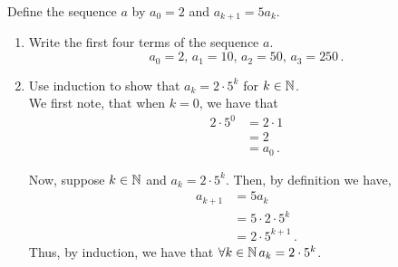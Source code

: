 \guard



\begin{exmp}
\label{exmp:showClosedFormFormulaWorks}
  Define the sequence $a$ by $a_0=2$ and $a_{k+1} = 5a_k$.
  \begin{enumerate}
    \item Write the first four terms of the sequence $a$.\\
    \[ a_0 = 2,\,a_1=10,\,a_2=50,\,a_3=250\,.\]
    \item Use induction to show that $a_k=2\cdot 5^k$ for $k\in\mathbb{N}$.\\
    We first note, that when $k=0$, we have that
    \begin{align*}
      2\cdot 5^0  &= 2 \cdot 1 \\
                  &= 2 \\
                  &= a_0\,.
    \end{align*}

    Now, suppose $k\in\mathbb{N}$ and $a_k = 2\cdot 5^k$.
    Then, by definition we have,
    \begin{align*}
      a_{k+1} &= 5a_k \\
              &= 5\cdot 2 \cdot 5^k \\
              &= 2 \cdot 5^{k+1}\,.
    \end{align*}
    Thus, by induction, we have that $\forall k\in\mathbb{N}\,a_k=2\cdot 5^k$.
  \end{enumerate}
\end{exmp}

